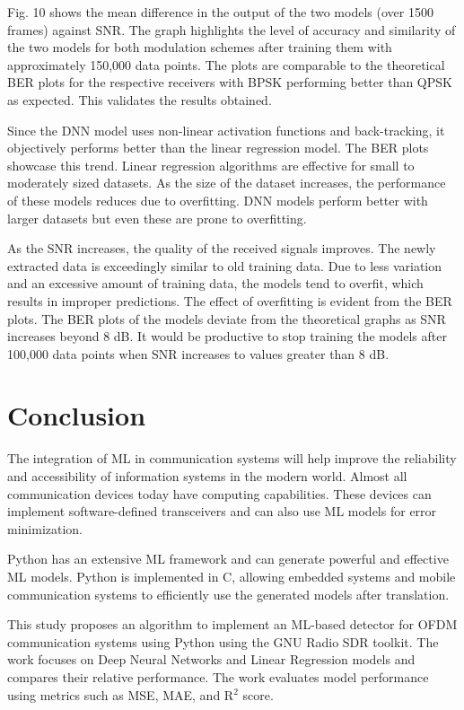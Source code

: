 \documentclass[conference]{IEEEtran}
\begin{document}
Fig. 10 shows the mean difference in the output of the two models (over 1500 frames) against SNR. The graph highlights the level of accuracy and similarity of the two models for both modulation schemes after training them with approximately 150,000 data points. The plots are comparable to the theoretical BER plots for the respective receivers with BPSK performing better than QPSK as expected. This validates the results obtained.

Since the DNN model uses non-linear activation functions and back-tracking, it objectively performs better than the linear regression model. The BER plots showcase this trend. Linear regression algorithms are effective for small to moderately sized datasets. As the size of the dataset increases, the performance of these models reduces due to overfitting. DNN models perform better with larger datasets but even these are prone to overfitting.

As the SNR increases, the quality of the received signals improves. The newly extracted data is exceedingly similar to old training data. Due to less variation and an excessive amount of training data, the models tend to overfit, which results in improper predictions. The effect of overfitting is evident from the BER plots. The BER plots of the models deviate from the theoretical graphs as SNR increases beyond 8 dB. It would be productive to stop training the models after 100,000 data points when SNR increases to values greater than 8 dB.

\section{Conclusion}
The integration of ML in communication systems will help improve the reliability and accessibility of information systems in the modern world. Almost all communication devices today have computing capabilities. These devices can implement software-defined transceivers and can also use ML models for error minimization. 

Python has an extensive ML framework and can generate powerful and effective ML models. Python is implemented in C, allowing embedded systems and mobile communication systems to efficiently use the generated models after translation.

This study proposes an algorithm to implement an ML-based detector for OFDM communication systems using Python using the GNU Radio SDR toolkit. The work focuses on Deep Neural Networks and Linear Regression models and compares their relative performance. The work evaluates model performance using metrics such as MSE, MAE, and R$^{2}$ score. 
\end{document}
